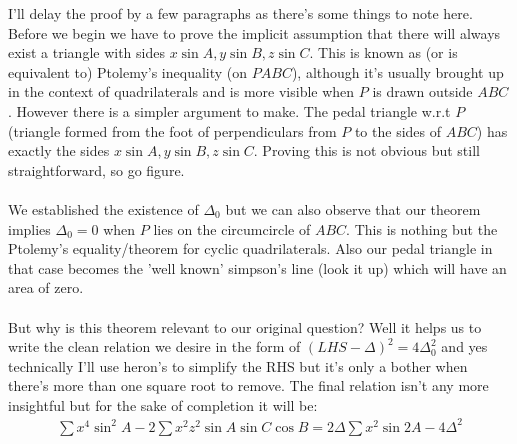 \documentclass{article}
\begin{document}
I'll delay the proof by a few paragraphs as there's some things to note here. Before we begin we have to prove the implicit assumption that there will always exist a triangle with sides $x\sin A, y\sin B, z\sin C$. This is known as (or is equivalent to) Ptolemy's inequality (on $PABC$), although it's usually brought up in the context of quadrilaterals and is more visible when $P$ is drawn outside $ABC$. However there is a simpler argument to make. The pedal triangle w.r.t $P$ (triangle formed from the foot of perpendiculars from $P$ to the sides of $ABC$) has exactly the sides $x\sin A, y\sin B, z\sin C$. Proving this is not obvious but still straightforward, so go figure.
\\\\
We established the existence of $\Delta_0$ but we can also observe that our theorem implies $\Delta_0 = 0$ when $P$ lies on the circumcircle of $ABC$. This is nothing but the Ptolemy's equality/theorem for cyclic quadrilaterals. Also our pedal triangle in that case becomes the 'well known' simpson's line (look it up) which will have an area of zero.
\\\\
But why is this theorem relevant to our original question? Well it helps us to write the clean relation we desire in the form of $(LHS-\Delta)^2 = 4\Delta_0^2$ and yes technically I'll use heron's to simplify the RHS but it's only a bother when there's more than one square root to remove. The final relation isn't any more insightful but for the sake of completion it will be:
\begin{align}
    \sum x^4 \sin^2A - 2\sum x^2z^2\sin A\sin C\cos B = 2\Delta\sum x^2\sin 2A - 4\Delta^2
\end{align}
\end{document}
